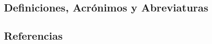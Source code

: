 \documentclass{article}
\begin{document}


    \subsection{Definiciones, Acrónimos y Abreviaturas}





























    \subsection{Referencias}
\end{document}
